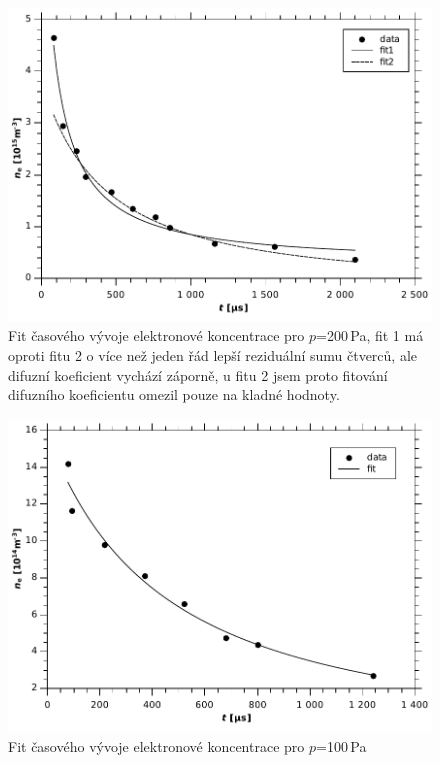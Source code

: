 \documentclass[12pt]{article}
\begin{document}
\begin{figure}[htbp]
\begin{center}
\includegraphics[width=13cm]{fit200pa.pdf}
\caption{Fit časového vývoje elektronové koncentrace pro $p$=200\,Pa, fit 1 má oproti fitu 2 o více než jeden řád lepší reziduální sumu čtverců, ale difuzní koeficient vychází záporně, u fitu 2 jsem proto fitování difuzního koeficientu omezil pouze na kladné hodnoty.}
\label{fit200}
\end{center}
\end{figure}

\begin{figure}[htbp]
\begin{center}
\includegraphics[width=13cm]{fit100Pa.pdf}
\caption{Fit časového vývoje elektronové koncentrace pro $p$=100\,Pa}
\label{fit100}
\end{center}
\end{figure}
\end{document}
